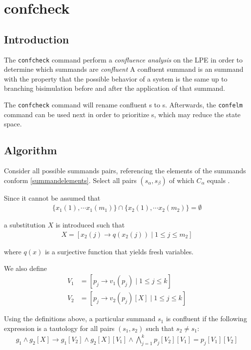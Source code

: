 \chapter{confcheck} \label{confcheck}

\section{Introduction}

The \texttt{confcheck} command perform a \emph{confluence analysis} on the LPE in order to determine which \istep{} summands are \emph{confluent}
A confluent \istep{} summand is an \istep{} summand with the property that the possible behavior of a system is the same up to branching bisimulation before and after the application of that summand.

The \texttt{confcheck} command will rename confluent \istep{}s to \cistep{}s.
Afterwards, the \texttt{confelm} command can be used next in order to prioritize \cistep{}s, which may reduce the state space.

\section{Algorithm}

Consider all possible summands pairs, referencing the elements of the summands conform \ref{summandelements}.
Select all pairs $(s_\alpha, s_\beta)$ of which $C_\alpha$ equals \istep{}.

Since it cannot be assumed that
\begin{align*}
\{ x_1(1), \cdots{} x_1(m_1) \} \cap \{ x_2(1), \cdots{} x_2(m_2) \} = \emptyset{}
\end{align*}

a substitution $X$ is introduced such that
\begin{align*}
X = [ x_2(j) \rightarrow q(x_2(j)) \;|\; 1 \leq j \leq m_2 ]
\end{align*}

where $q(x)$ is a surjective function that yields fresh variables.

We also define
\begin{align*}
V_{1} &= [p_j \rightarrow v_1(p_j) \;|\; 1 \leq j \leq k] \\
V_{2} &= [p_j \rightarrow v_2(p_j)[X] \;|\; 1 \leq j \leq k]
\end{align*}

Using the definitions above, a particular \istep{} summand $s_1$ is confluent if the following expression is a tautology for all pairs $(s_1, s_2)$ such that $s_2 \neq s_1$:
\begin{align*}
g_1 \land g_2[X] \rightarrow g_1[V_2] \land g_2[X][V_1] \land \bigwedge\limits_{j=1}^{k} p_j[V_2][V_1] = p_j[V_1][V_2]
\end{align*}

